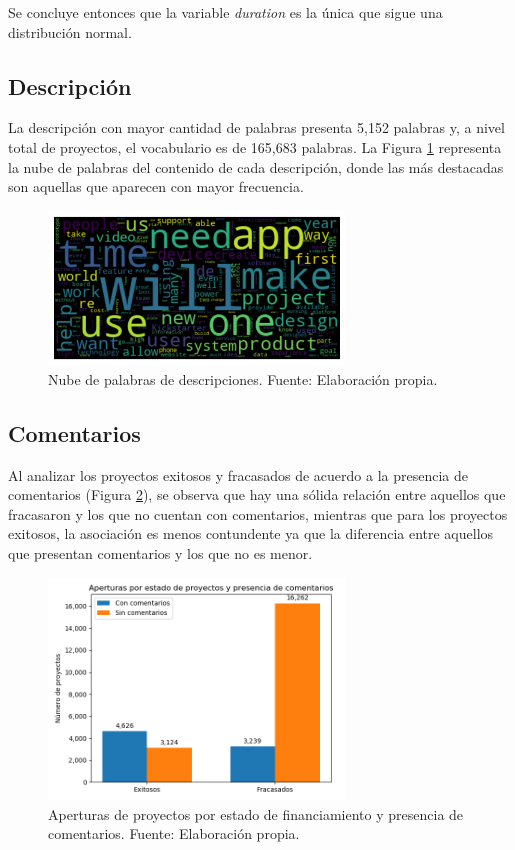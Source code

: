 Se concluye entonces que la variable \textit{duration} es la única que sigue una distribución normal.

\subsection{Descripción}
La descripción con mayor cantidad de palabras presenta 5,152 palabras y, a nivel total de proyectos, el vocabulario es de 165,683 palabras. La Figura \ref{4:fig24} representa la nube de palabras del contenido de cada descripción, donde las más destacadas son aquellas que aparecen con mayor frecuencia.

\begin{figure}[!ht]
	\begin{center}
		\includegraphics[width=0.7\textwidth]{4/figures/description_wordcloud_original_data.png}
		\caption{Nube de palabras de descripciones. Fuente: Elaboración propia.}
		\label{4:fig24}
	\end{center}
\end{figure}

\subsection{Comentarios}
Al analizar los proyectos exitosos y fracasados de acuerdo a la presencia de comentarios (Figura \ref{4:fig25}), se observa que hay una sólida relación entre aquellos que fracasaron y los que no cuentan con comentarios, mientras que para los proyectos exitosos, la asociación es menos contundente ya que la diferencia entre aquellos que presentan comentarios y los que no es menor.

\begin{figure}[!ht]
	\begin{center}
		\includegraphics[width=0.7\textwidth]{4/figures/projects state by comment.png}
		\caption{Aperturas de proyectos por estado de financiamiento y presencia de comentarios. Fuente: Elaboración propia.}
		\label{4:fig25}
	\end{center}
\end{figure}

